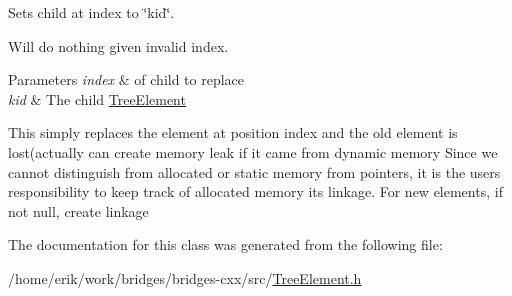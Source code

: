 Sets child at index to \char`\"{}kid\char`\"{}. 

Will do nothing given invalid index.


\begin{DoxyParams}{Parameters}
{\em index} & of child to replace \\
\hline
{\em kid} & The child \hyperlink{classbridges_1_1datastructure_1_1_tree_element}{Tree\+Element} \\
\hline
\end{DoxyParams}
This simply replaces the element at position index and the old element is lost(actually can create memory leak if it came from dynamic memory Since we cannot distinguish from allocated or static memory from pointers, it is the user\textquotesingle{}s responsibility to keep track of allocated memory its linkage. For new elements, if not null, create linkage

The documentation for this class was generated from the following file\+:\begin{DoxyCompactItemize}
\item 
/home/erik/work/bridges/bridges-\/cxx/src/\hyperlink{_tree_element_8h}{Tree\+Element.\+h}\end{DoxyCompactItemize}
